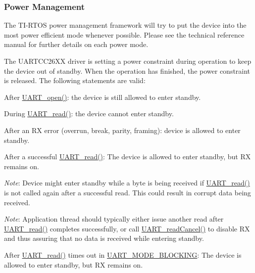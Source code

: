 \subsubsection*{Power Management\label{_u_a_r_t_c_c26_x_x_8h_POWER_MANAGEMENT}%
\hypertarget{_u_a_r_t_c_c26_x_x_8h_POWER_MANAGEMENT}{}%
}

The T\+I-\/\+R\+T\+O\+S power management framework will try to put the device into the most power efficient mode whenever possible. Please see the technical reference manual for further details on each power mode.

The U\+A\+R\+T\+C\+C26\+X\+X driver is setting a power constraint during operation to keep the device out of standby. When the operation has finished, the power constraint is released. The following statements are valid\+:
\begin{DoxyItemize}
\item After \hyperlink{_u_a_r_t_8h_a0442ea1ec23901168da31726bb3254c1}{U\+A\+R\+T\+\_\+open()}\+: the device is still allowed to enter standby.
\item During \hyperlink{_u_a_r_t_8h_a023152d57539cad94bdd813956013e73}{U\+A\+R\+T\+\_\+read()}\+: the device cannot enter standby.
\item After an R\+X error (overrun, break, parity, framing)\+: device is allowed to enter standby.
\item After a successful \hyperlink{_u_a_r_t_8h_a023152d57539cad94bdd813956013e73}{U\+A\+R\+T\+\_\+read()}\+: The device is allowed to enter standby, but R\+X remains on.
\begin{DoxyItemize}
\item {\itshape Note}\+: Device might enter standby while a byte is being received if \hyperlink{_u_a_r_t_8h_a023152d57539cad94bdd813956013e73}{U\+A\+R\+T\+\_\+read()} is not called again after a successful read. This could result in corrupt data being received.
\item {\itshape Note}\+: Application thread should typically either issue another read after \hyperlink{_u_a_r_t_8h_a023152d57539cad94bdd813956013e73}{U\+A\+R\+T\+\_\+read()} completes successfully, or call \hyperlink{_u_a_r_t_8h_a51ed7e94d5b409ca1fcb2d65c5a25c3c}{U\+A\+R\+T\+\_\+read\+Cancel()} to disable R\+X and thus assuring that no data is received while entering standby.
\end{DoxyItemize}
\item After \hyperlink{_u_a_r_t_8h_a023152d57539cad94bdd813956013e73}{U\+A\+R\+T\+\_\+read()} times out in \hyperlink{_u_a_r_t_8h_a2507a620dba95cd20885c52494d19e90ae6b6bd5d2d5df859ad6724e89e605ebf}{U\+A\+R\+T\+\_\+\+M\+O\+D\+E\+\_\+\+B\+L\+O\+C\+K\+I\+N\+G}\+: The device is allowed to enter standby, but R\+X remains on.

\end{DoxyItemize}
